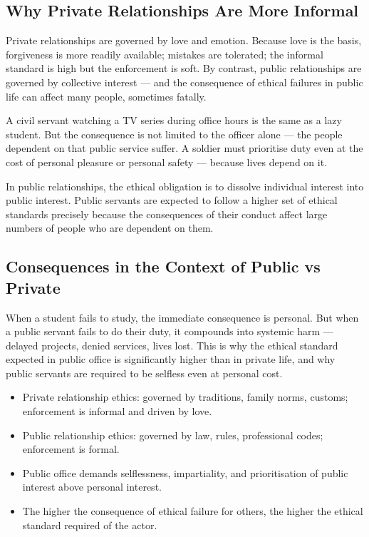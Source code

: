 \subsection{Why Private Relationships Are More Informal}

Private relationships are governed by love and emotion. Because love is the basis, forgiveness is more readily available; mistakes are tolerated; the informal standard is high but the enforcement is soft. By contrast, public relationships are governed by collective interest --- and the consequence of ethical failures in public life can affect many people, sometimes fatally.

\begin{ExampleBox}
A civil servant watching a TV series during office hours is the same as a lazy student. But the consequence is not limited to the officer alone --- the people dependent on that public service suffer. A soldier must prioritise duty even at the cost of personal pleasure or personal safety --- because lives depend on it.
\end{ExampleBox}

\begin{CriticalPoint}
In public relationships, the ethical obligation is to dissolve individual interest into public interest. Public servants are expected to follow a higher set of ethical standards precisely because the consequences of their conduct affect large numbers of people who are dependent on them.
\end{CriticalPoint}

\subsection{Consequences in the Context of Public vs Private}

When a student fails to study, the immediate consequence is personal. But when a public servant fails to do their duty, it compounds into systemic harm --- delayed projects, denied services, lives lost. This is why the ethical standard expected in public office is significantly higher than in private life, and why public servants are required to be selfless even at personal cost.

\begin{QuickRevision}
\begin{itemize}
\item Private relationship ethics: governed by traditions, family norms, customs; enforcement is informal and driven by love.
\item Public relationship ethics: governed by law, rules, professional codes; enforcement is formal.
\item Public office demands selflessness, impartiality, and prioritisation of public interest above personal interest.
\item The higher the consequence of ethical failure for others, the higher the ethical standard required of the actor.
\end{itemize}
\end{QuickRevision}

